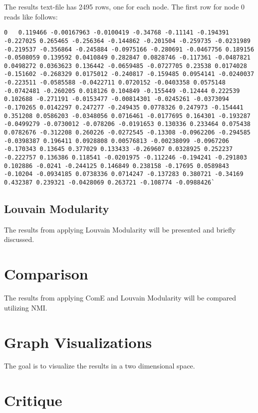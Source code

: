 \documentclass[sigconf]{acmart}
\begin{document}
The results text-file has 2495 rows, one for each node. The first row for node 0 reads like follows:
\begin{lstlisting}
0	0.119466 -0.00167963 -0.0100419 -0.34768 -0.11141 -0.194391 -0.227025 0.265465 -0.256364 -0.144862 -0.201504 -0.259735 -0.0231989 -0.219537 -0.356864 -0.245884 -0.0975166 -0.280691 -0.0467756 0.189156 -0.0508059 0.139592 0.0410849 0.282847 0.0828746 -0.117361 -0.0487821 0.0498272 0.0363623 0.136442 -0.0659485 -0.0727705 0.23538 0.0174028 -0.151602 -0.268329 0.0175012 -0.240817 -0.159485 0.0954141 -0.0240037 -0.223511 -0.0585588 -0.0422711 0.0720152 -0.0403358 0.0575148 -0.0742481 -0.260205 0.018126 0.104849 -0.155449 -0.12444 0.222539 0.102688 -0.271191 -0.0153477 -0.00814301 -0.0245261 -0.0373094 -0.170265 0.0142297 0.247277 -0.249435 0.0778326 0.247973 -0.154441 0.351208 0.0586203 -0.0348056 0.0716461 -0.0177695 0.164301 -0.193287 -0.0499279 -0.0730012 -0.078206 -0.0191653 0.130336 0.233464 0.075438 0.0782676 -0.312208 0.260226 -0.0272545 -0.13308 -0.0962206 -0.294585 -0.0398387 0.196411 0.0928808 0.00576813 -0.00238099 -0.0967206 -0.170343 0.13645 0.377029 0.133433 -0.269607 0.0328925 0.252237 -0.222757 0.136386 0.118541 -0.0201975 -0.112246 -0.194241 -0.291803 0.102886 -0.0241 -0.244125 0.146849 0.238158 -0.17695 0.0589843 -0.10204 -0.0934185 0.0738336 0.0714247 -0.137283 0.380721 -0.34169 0.432387 0.239321 -0.0428069 0.263721 -0.108774 -0.0988426`
\end{lstlisting}

\subsection{Louvain Modularity}

The results from applying Louvain Modularity will be presented and briefly discussed.

\section{Comparison}

The results from applying ComE and Louvain Modularity will be compared utilizing NMI.

\section{Graph Visualizations}

The goal is to visualize the results in a two dimensional space.

\section{Critique}
\end{document}
